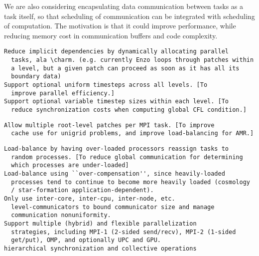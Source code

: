 \documentclass{article}
\begin{document}
We are also considering encapsulating data communication between tasks
as a task itself, so that scheduling of communication can be
integrated with scheduling of computation.  The motivation is that it
could improve performance, while reducing memory cost in communication
buffers and code complexity.

\begin{verbatim}
Reduce implicit dependencies by dynamically allocating parallel
  tasks, ala \charm. (e.g. currently Enzo loops through patches within
  a level, but a given patch can proceed as soon as it has all its
  boundary data)
Support optional uniform timesteps across all levels. [To
  improve parallel efficiency.]
Support optional variable timestep sizes within each level. [To
  reduce synchronization costs when computing global CFL condition.]
\end{verbatim}

\begin{verbatim}
Allow multiple root-level patches per MPI task. [To improve
  cache use for unigrid problems, and improve load-balancing for AMR.]
\end{verbatim}

\begin{verbatim}
Load-balance by having over-loaded processors reassign tasks to
  random processes. [To reduce global communication for determining
  which processes are under-loaded]
Load-balance using ``over-compensation'', since heavily-loaded
  processes tend to continue to become more heavily loaded (cosmology
  / star-formation application-dependent).
Only use inter-core, inter-cpu, inter-node, etc.
  level-communicators to bound communicator size and manage
  communication nonuniformity.
Support multiple (hybrid) and flexible parallelization
  strategies, including MPI-1 (2-sided send/recv), MPI-2 (1-sided
  get/put), OMP, and optionally UPC and GPU.
hierarchical synchronization and collective operations
\end{verbatim}
\end{document}
